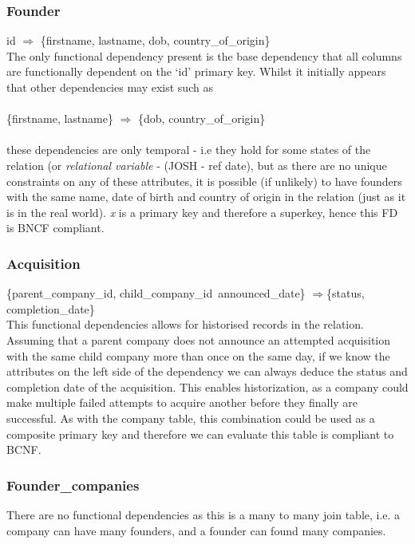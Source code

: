 \documentclass[12pt]{article}
\begin{document}
\subsubsection{Founder}
id $\Rightarrow$ \{{firstname, lastname, dob, country\_of\_origin\}}\\

The only functional dependency present is the base dependency that all columns are functionally dependent on the `id' primary key. Whilst it initially appears that other dependencies may exist such as \\\\
\{{firstname, lastname\}} $\Rightarrow$ \{{dob, country\_of\_origin\}}\\\\
these dependencies are only temporal - i.e they hold for some states of the relation (or \emph{relational variable} - (JOSH - ref date), but as there are no unique constraints on any of these attributes, it is possible (if unlikely) to have founders with the same name, date of birth and country of origin in the relation (just as it is in the real world). \emph{x} is a primary key and therefore a superkey, hence this FD is BNCF compliant.

\subsubsection{Acquisition}
\{{parent\_company\_id, child\_company\_id\, announced\_date}\} $\Rightarrow${\{status, completion\_date}\} \\

This functional dependencies allows for historised records in the relation. Assuming that a parent company does not announce an attempted acquisition with the same child company more than once on the same day, if we know the attributes on the left side of the dependency we can always deduce the status and completion date of the acquisition. This enables historization, as a company could make multiple failed attempts to acquire another before they finally are successful. As with the company table, this combination could be used as a composite primary key and therefore we can evaluate this table is compliant to BCNF.

\subsubsection{Founder\_companies}
There are no functional dependencies as this is a many to many join table, i.e. a company can have many founders, and a founder can found many companies.
\end{document}
